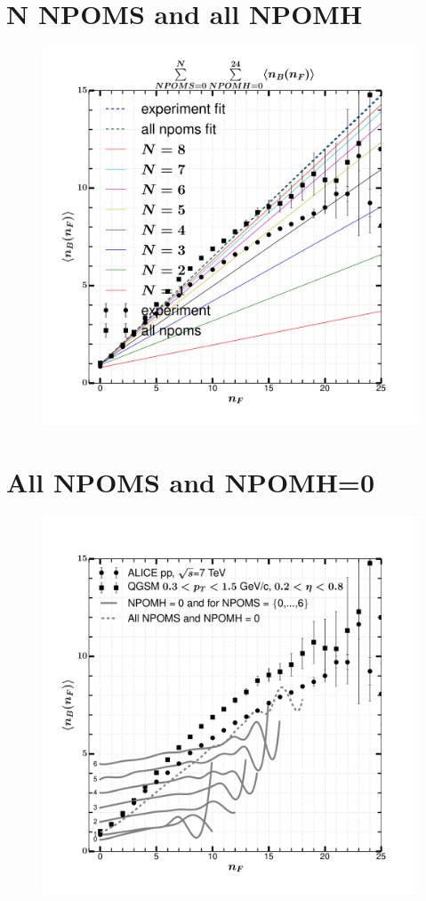 \documentclass[]{article}
\begin{document}
\section*{\centering N NPOMS and all NPOMH}
\begin{figure}[h!]
\centering
\includegraphics[scale=0.5]{../analyzed/nbnf_Nnpoms_allnpomh.pdf}
\caption{}
\end{figure}

\begin{center}
\end{center}

\newpage
\section*{\centering All NPOMS and NPOMH=0}

\begin{figure}[h!]
    \centering
\includegraphics[scale=0.5]{../analyzed/nbnf_allnpoms_0npomh.pdf}
\caption{}
\end{figure}
\end{document}
